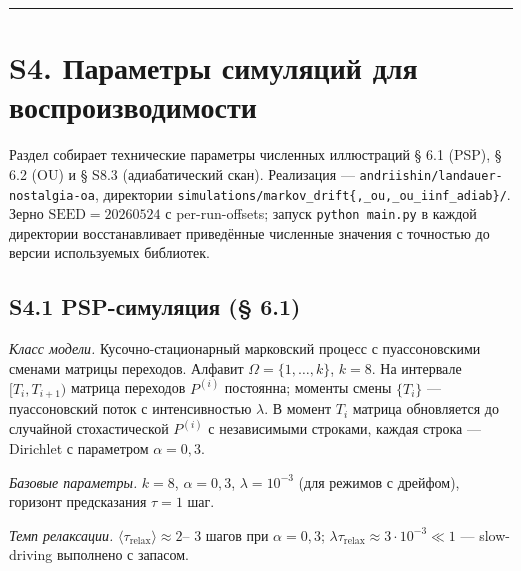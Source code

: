 \documentclass[pdflatex,sn-mathphys-ay]{sn-jnl}
\begin{document}
\begin{center}\rule{0.5\linewidth}{0.5pt}\end{center}



\section*{S4. Параметры симуляций для воспроизводимости}\label{s4.-ux43fux430ux440ux430ux43cux435ux442ux440ux44b-ux441ux438ux43cux443ux43bux44fux446ux438ux439-ux434ux43bux44f-ux432ux43eux441ux43fux440ux43eux438ux437ux432ux43eux434ux438ux43cux43eux441ux442ux438}



Раздел собирает технические параметры численных иллюстраций § 6.1 (PSP), § 6.2 (OU) и § S8.3 (адиабатический скан). Реализация --- \texttt{andriishin/landauer-nostalgia-oa}, директории \texttt{simulations/markov\_drift\{,\_ou,\_ou\_iinf\_adiab\}/}. Зерно \(\text{SEED} = 20260524\) с per-run-offsets; запуск \texttt{python\ main.py} в каждой директории восстанавливает приведённые численные значения с точностью до версии используемых библиотек.



\subsection*{S4.1 PSP-симуляция (§ 6.1)}\label{s4.1-psp-ux441ux438ux43cux443ux43bux44fux446ux438ux44f-6.1}



\emph{Класс модели.} Кусочно-стационарный марковский процесс с пуассоновскими сменами матрицы переходов. Алфавит \(\Omega = \{1, \ldots, k\}\), \(k = 8\). На интервале \([T_i, T_{i+1})\) матрица переходов \(P^{(i)}\) постоянна; моменты смены \(\{T_i\}\) --- пуассоновский поток с интенсивностью \(\lambda\). В момент \(T_i\) матрица обновляется до случайной стохастической \(P^{(i)}\) с независимыми строками, каждая строка --- Dirichlet с параметром \(\alpha = 0,3\).



\emph{Базовые параметры.} \(k = 8\), \(\alpha = 0,3\), \(\lambda = 10^{-3}\) (для режимов с дрейфом), горизонт предсказания \(\tau = 1\) шаг.



\emph{Темп релаксации.} \(\langle \tau_{\text{relax}} \rangle \approx 2\)-- \(3\) шагов при \(\alpha = 0,3\); \(\lambda \tau_{\text{relax}} \approx 3 \cdot 10^{-3} \ll 1\) --- slow-driving выполнено с запасом.
\end{document}
